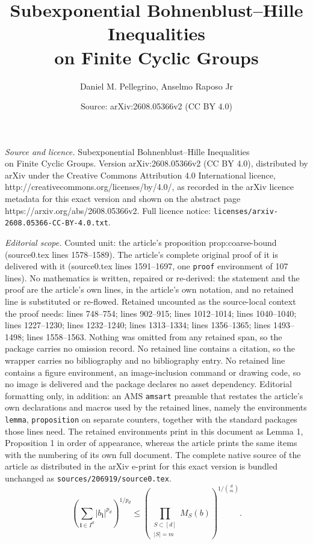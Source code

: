 \documentclass[10pt,a4paper]{amsart}
\title{Subexponential Bohnenblust--Hille Inequalities\\on Finite Cyclic Groups}
\author{Daniel M. Pellegrino, Anselmo Raposo Jr}
\date{Source: arXiv:2608.05366v2 (CC BY 4.0)}
\begin{document}
\maketitle

\noindent\emph{Source and licence.} Subexponential Bohnenblust--Hille Inequalities\\on Finite Cyclic Groups. Version arXiv:2608.05366v2 (CC BY 4.0), distributed by arXiv under the Creative Commons Attribution 4.0 International licence, http://creativecommons.org/licenses/by/4.0/, as recorded in the arXiv licence metadata for this exact version and shown on the abstract page https://arxiv.org/abs/2608.05366v2. Full licence notice: \texttt{licenses/arxiv-2608.05366-CC-BY-4.0.txt}.\par\smallskip

\noindent\textit{Editorial scope.} Counted unit: the article's proposition prop:coarse-bound (source0.tex lines 1578--1589). The article's complete original proof of it is delivered with it (source0.tex lines 1591--1697, one \texttt{proof} environment of 107 lines). No mathematics is written, repaired or re-derived: the statement and the proof are the article's own lines, in the article's own notation, and no retained line is substituted or re-flowed.  Retained uncounted as the source-local context the proof needs: lines 748--754; lines 902--915; lines 1012--1014; lines 1040--1040; lines 1227--1230; lines 1232--1240; lines 1313--1334; lines 1356--1365; lines 1493--1498; lines 1558--1563.  Nothing was omitted from any retained span, so the package carries no omission record.  No retained line contains a citation, so the wrapper carries no bibliography and no bibliography entry.  No retained line contains a figure environment, an image-inclusion command or drawing code, so no image is delivered and the package declares no asset dependency.  Editorial formatting only, in addition: an AMS \texttt{amsart} preamble that restates the article's own declarations and macros used by the retained lines, namely the environments \texttt{lemma}, \texttt{proposition} on separate counters, together with the standard packages those lines need.  The retained environments print in this document as Lemma 1, Proposition 1 in order of appearance, whereas the article prints the same items with the numbering of its own full document.  The complete native source of the article as distributed in the arXiv e-print for this exact version is bundled unchanged as \texttt{sources/206919/source0.tex}.
\begin{equation}\label{eq:blei-body}
 \left(\sum_{\mathbf i\in I^d}|b_{\mathbf i}|^{p_d}\right)^{1/p_d}
 \leq
 \left(
 \prod_{\substack{S\subset[d]\\ |S|=m}}M_S(b)
 \right)^{1/\binom dm}.
\end{equation}
\end{document}
